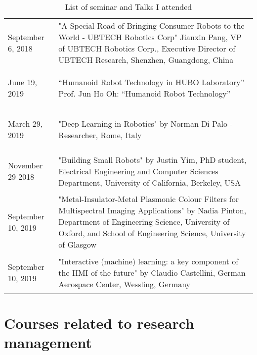 \begin{table}[ht]
{\begin{tabular}{p{2.5cm} p{14cm}}
        \begin{center}
            September 6, 2018
        \end{center} & "A Special Road of Bringing Consumer Robots to the World - UBTECH Robotics Corp" Jianxin Pang, VP of UBTECH Robotics Corp., Executive Director of UBTECH Research, Shenzhen, Guangdong, China\\
        
       \rowcolor{lightgray} \begin{center}
           June 19, 2019
       \end{center} &“Humanoid Robot Technology in HUBO Laboratory” Prof. Jun Ho Oh: “Humanoid Robot Technology”\\
        \begin{center}
            March 29, 2019
        \end{center}& "Deep Learning in Robotics" by Norman Di Palo - Researcher, Rome, Italy \\
        
        \rowcolor{lightgray} \begin{center}
            November 29 2018
        \end{center} & "Building Small Robots" by Justin Yim, PhD student, Electrical Engineering and Computer Sciences Department, University of California, Berkeley, USA \\
        \begin{center}
            September 10, 2019 
        \end{center} & "Metal-Insulator-Metal Plasmonic Colour Filters for Multispectral Imaging Applications" by Nadia Pinton, Department of Engineering Science, University of Oxford, and School of Engineering Science, University of Glasgow\\
        
        \rowcolor{lightgray} \begin{center}
              September 10, 2019
        \end{center} & "Interactive (machine) learning: a key component of the HMI of the future" by Claudio Castellini, German Aerospace Center, Wessling, Germany\\
 \end{tabular}}
 \caption{List of seminar and Talks I attended}
 \label{table:Seminar}
\end{table}

\section{Courses related to research management}

